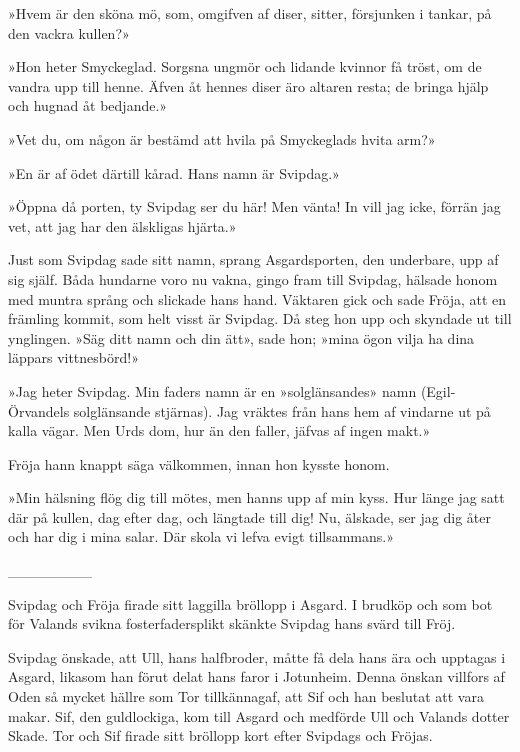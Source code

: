 »Hvem är den sköna mö, som, omgifven af diser, sitter, försjunken i
tankar, på den vackra kullen?»

»Hon heter Smyckeglad. Sorgsna ungmör och lidande kvinnor få tröst, om
de vandra upp till henne. Äfven åt hennes diser äro altaren resta; de
bringa hjälp och hugnad åt bedjande.»

»Vet du, om någon är bestämd att hvila på Smyckeglads hvita arm?»

»En är af ödet därtill kårad. Hans namn är Svipdag.»

»Öppna då porten, ty Svipdag ser du här! Men vänta! In vill jag icke,
förrän jag vet, att jag har den älskligas hjärta.»

Just som Svipdag sade sitt namn, sprang Asgardsporten, den underbare,
upp af sig själf. Båda hundarne voro nu vakna, gingo fram till Svipdag,
hälsade honom med muntra språng och slickade hans hand. Väktaren gick
och sade Fröja, att en främling kommit, som helt visst är Svipdag. Då
steg hon upp och skyndade ut till ynglingen. »Säg ditt
\protect\hypertarget{lb1625905.xhtmlux5cux23start128}{}{}\protect\hypertarget{lb1625905.xhtmlux5cux23start128-a}{}{}\protect\hypertarget{lb1625905.xhtmlux5cux23start128-b}{}{}\protect\hypertarget{lb1625905.xhtmlux5cux23start128-c}{}{}\protect\hypertarget{lb1625905.xhtmlux5cux23start128-d}{}{}
namn och din ätt», sade hon; »mina ögon vilja ha dina läppars
vittnesbörd!»

»Jag heter Svipdag. Min faders namn är en »solglänsandes» namn
(Egil-Örvandels solglänsande stjärnas). Jag vräktes från hans hem af
vindarne ut på kalla vägar. Men Urds dom, hur än den faller, jäfvas af
ingen makt.»

Fröja hann knappt säga välkommen, innan hon kysste honom.

»Min hälsning flög dig till mötes, men hanns upp af min kyss. Hur länge
jag satt där på kullen, dag efter dag, och längtade till dig! Nu,
älskade, ser jag dig åter och har dig i mina salar. Där skola vi lefva
evigt tillsammans.»

{\_\_\_\_\_\_\_\_}

Svipdag och Fröja firade sitt laggilla bröllopp i Asgard. I brudköp och
som bot för Valands svikna fosterfadersplikt skänkte Svipdag hans svärd
till Fröj.

Svipdag önskade, att Ull, hans halfbroder, måtte få dela hans ära och
upptagas i Asgard, likasom han förut delat hans faror i Jotunheim. Denna
önskan villfors af Oden så mycket hällre som Tor tillkännagaf, att Sif
och han beslutat att vara makar. Sif, den guldlockiga, kom till Asgard
och medförde Ull och Valands dotter Skade. Tor och Sif firade sitt
bröllopp kort efter Svipdags och Fröjas.

